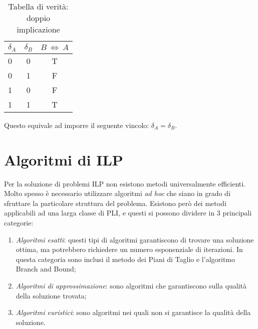 \begin{enumerate}
\begin{table}[h!]
  \begin{center}
    \begin{tabular}{l|c|c} %
      $\delta_A$ & $\delta_B$ & $B~\Longleftrightarrow~A$ \\
      \hline
      0 & 0 & T\\
      0 & 1 & F\\
      1 & 0 & F\\
      1 & 1 & T\\
    \end{tabular}
    \caption{Tabella di verità: doppio implicazione}
    \label{tab:tableDoppiaImp}
  \end{center}
\end{table}

Questo equivale ad imporre il seguente vincolo: $\delta_A = \delta_B$.
\end{enumerate}

%

\section{Algoritmi di ILP}
Per la soluzione di problemi ILP non esistono metodi universalmente efficienti. Molto spesso è necessario utilizzare algoritmi \textit{ad hoc} che siano in grado di sfruttare la particolare struttura del problema.
Esistono però dei metodi applicabili ad una larga classe di PLI, e questi si possono dividere in 3 principali categorie:
\begin{enumerate}
\item \textit{Algoritmi esatti}: questi tipi di algoritmi garantiscono di trovare una soluzione ottima, ma potrebbero richiedere un numero esponenziale di iterazioni. In questa categoria sono inclusi il metodo dei Piani di Taglio e l'algoritmo Branch and Bound;
\item \textit{Algoritmi di approssimazione}: sono algoritmi che garantiscono sulla qualità della soluzione trovata;
\item \textit{Algoritmi euristici}: sono algoritmi nei quali non si garantisce la qualità della soluzione.
\end{enumerate} 

